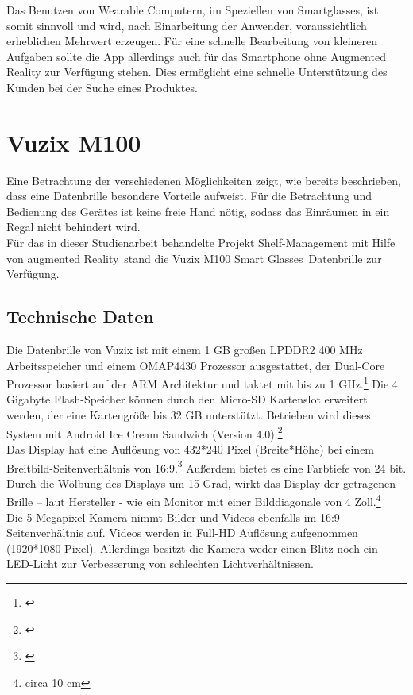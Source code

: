 Das Benutzen von Wearable Computern, im Speziellen von Smartglasses, ist somit sinnvoll und wird, nach Einarbeitung der Anwender, voraussichtlich erheblichen Mehrwert erzeugen. Für eine schnelle Bearbeitung von kleineren Aufgaben sollte die App allerdings auch für das Smartphone ohne Augmented Reality zur Verfügung stehen. Dies ermöglicht \zB eine schnelle Unterstützung des Kunden bei der Suche eines Produktes.

\section{Vuzix M100}
\label{sec:vuzix}
Eine Betrachtung der verschiedenen Möglichkeiten zeigt, wie bereits beschrieben, dass eine Datenbrille besondere Vorteile aufweist. Für die Betrachtung und Bedienung des Gerätes ist keine freie Hand nötig, sodass das Einräumen in ein Regal nicht behindert wird.\\

Für das in dieser Studienarbeit behandelte Projekt \glqq Shelf-Management mit Hilfe von augmented Reality\grqq\ stand die \glqq Vuzix M100 Smart Glasses\grqq\ Datenbrille zur Verfügung.

\subsection{Technische Daten}
Die Datenbrille von Vuzix ist mit einem 1 \ac{GB} großen LPDDR2 400 \ac{MHz} Arbeitsspeicher und einem OMAP4430 Prozessor ausgestattet, der Dual-Core Prozessor basiert auf der \ac{ARM} Architektur und taktet mit bis zu 1 \ac{GHz}.\footnote{\citep{omap4430}} Die 4 Gigabyte Flash-Speicher können durch den Micro-\acs{SD} Kartenslot erweitert werden, der eine Kartengröße bis 32 \ac{GB} unterstützt. Betrieben wird dieses System mit Android Ice Cream Sandwich (Version 4.0).\footnote{\citep{vuzixm100}}\\

Das Display hat eine Auflösung von 432*240 Pixel (Breite*Höhe) bei einem Breitbild-Seitenverhältnis von 16:9.\footnote{\citep{wqvga}} Außerdem bietet es eine Farbtiefe von 24 bit. Durch die Wölbung des Displays um 15 Grad, wirkt das Display der getragenen Brille – laut Hersteller - wie ein Monitor mit einer Bilddiagonale von 4 Zoll.\footnote{circa 10 \ac{cm}}\\

Die 5 Megapixel Kamera nimmt Bilder und Videos ebenfalls im 16:9 Seitenverhältnis auf. Videos werden in Full-HD Auflösung aufgenommen (1920*1080 Pixel). Allerdings besitzt die Kamera weder einen Blitz noch ein LED-Licht zur Verbesserung von schlechten Lichtverhältnissen.\\

